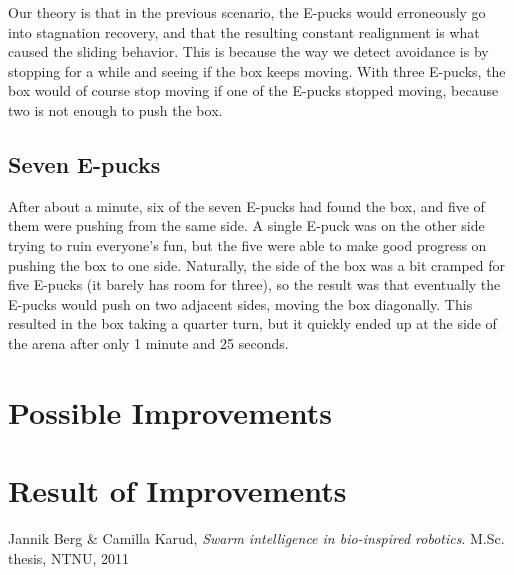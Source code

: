 \documentclass[a4paper,12pt]{article}
\begin{document}
Our theory is that in the previous scenario, the E-pucks would erroneously go into stagnation recovery, and that the resulting constant realignment is what caused the sliding behavior. This is because the way we detect avoidance is by stopping for a while and seeing if the box keeps moving. With three E-pucks, the box would of course stop moving if one of the E-pucks stopped moving, because two is not enough to push the box.

\subsection{Seven E-pucks}
After about a minute, six of the seven E-pucks had found the box, and five of them were pushing from the same side. A single E-puck was on the other side trying to ruin everyone's fun, but the five were able to make good progress on pushing the box to one side. Naturally, the side of the box was a bit cramped for five E-pucks (it barely has room for three), so the result was that eventually the E-pucks would push on two adjacent sides, moving the box diagonally. This resulted in the box taking a quarter turn, but it quickly ended up at the side of the arena after only 1 minute and 25 seconds.

\section{Possible Improvements}

\section{Result of Improvements}


\begin{thebibliography}{9}

  Jannik Berg \& Camilla Karud,
  \emph{Swarm intelligence in bio-inspired
robotics}.
  M.Sc. thesis,
  NTNU,
  2011

\end{thebibliography}
\end{document}
